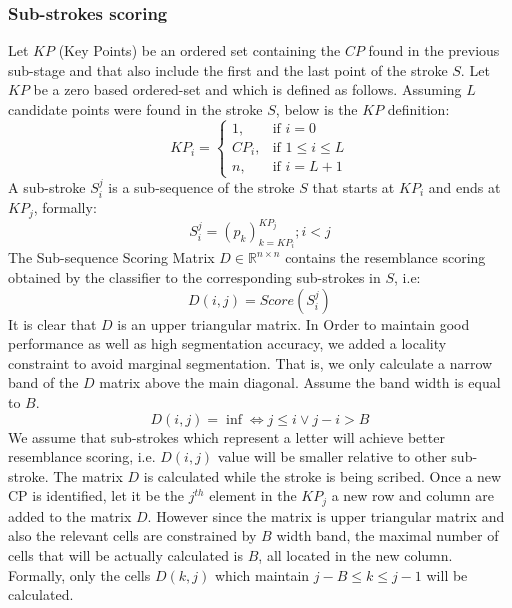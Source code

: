 \documentclass[journal,compsoc]{IEEEtran}
\begin{document}
\subsubsection{Sub-strokes scoring}
Let $KP$ (Key Points) be an ordered set containing the $CP$ found in the previous sub-stage and that also include the first and the last point of the stroke $S$. Let $KP$ be a zero based ordered-set and which is defined as follows. Assuming $L$ candidate points were found in the stroke $S$, below is the $KP$ definition: 
\begin{equation}
KP_{i} =\begin{cases}    1		, & \mbox{if } i=0 \\
							   CP_{i}	, & \mbox{if } 1\leq i \leq L \\
							   n    , & \mbox{if } i=L+1 
			\end{cases}				
\end{equation}
A sub-stroke $S_{i}^{j}$ is a sub-sequence of the stroke $S$ that starts at $KP_{i}$ and ends at $KP_{j}$, formally:
\begin{equation}
S_{i}^{j}=(p_{k})_{k=KP_{i}}^{KP_{j}}; i<j
\end{equation}
The Sub-sequence Scoring Matrix $D\in\mathbb{R}^{n\times n}$ contains the resemblance scoring obtained by the classifier to the corresponding sub-strokes in $S$, i.e:
\begin{equation}
D(i,j)=Score(S_{i}^{j})
\end{equation}
It is clear that $D$ is an upper triangular matrix. In Order to maintain good performance as well as high segmentation accuracy, we added a locality constraint to avoid marginal segmentation. That is, we only calculate a narrow band of the $D$ matrix above the main diagonal. Assume the band width is equal to $B$.
\begin{equation}
D(i,j)=\inf \Leftrightarrow j \leq i \vee j-i>B 
\end{equation}
We assume that sub-strokes which represent a letter will achieve better resemblance scoring, i.e. $D(i,j)$ value will be smaller relative to other sub-stroke. The matrix $D$ is calculated while the stroke is being scribed. Once a new CP is identified, let it be the $j^{th}$ element in the $KP_{j}$ a new row and column are added to the matrix $D$. However since the matrix is upper triangular matrix and also the relevant cells are constrained by $B$ width band, the maximal number of cells that will be actually calculated is $B$, all located in the new column. Formally, only the cells $D(k,j)$ which maintain $j-B\leq k \leq j-1$ will be calculated.\\
\end{document}

